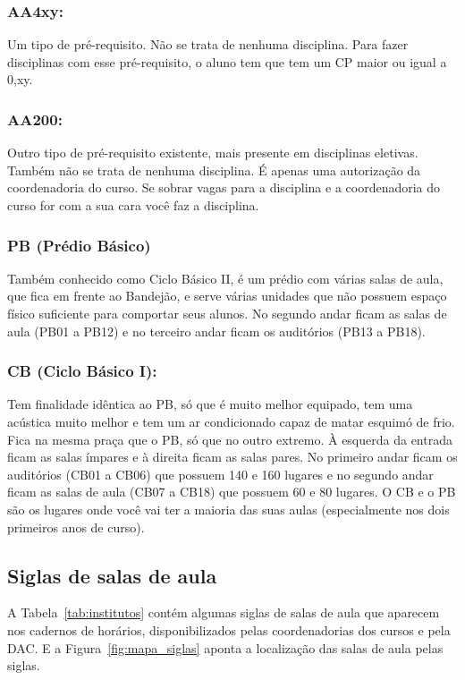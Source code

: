 \subsubsection{AA4xy:} Um tipo de pré-requisito. Não se trata de nenhuma
disciplina. Para fazer disciplinas com esse pré-requisito, o aluno tem que tem
um CP maior ou igual a 0,xy.

\subsubsection{AA200:} Outro tipo de pré-requisito existente, mais presente em
disciplinas eletivas. Também não se trata de nenhuma disciplina. É apenas uma
autorização da coordenadoria do curso. Se sobrar vagas para a disciplina e a
coordenadoria do curso for com a sua cara você faz a disciplina.

\subsubsection{PB (Prédio Básico)} Também conhecido como Ciclo Básico II, é um
prédio com várias salas de aula, que fica em frente ao Bandejão, e serve várias
unidades que não possuem espaço físico suficiente para comportar seus alunos. No
segundo andar ficam as salas de aula (PB01 a PB12) e no terceiro andar ficam os
auditórios (PB13 a PB18).

\subsubsection{CB (Ciclo Básico I):} Tem finalidade idêntica ao PB, só que é
muito melhor equipado, tem uma acústica muito melhor e tem um ar condicionado
capaz de matar esquimó de frio. Fica na mesma praça que o PB, só que no outro
extremo. À esquerda da entrada ficam as salas ímpares e à direita ficam as salas
pares. No primeiro andar ficam os auditórios (CB01 a CB06) que possuem 140 e 160
lugares e no segundo andar ficam as salas de aula (CB07 a CB18) que possuem 60 e
80 lugares.  O CB e o PB são os lugares onde você vai ter a maioria das suas
aulas (especialmente nos dois primeiros anos de curso).

\subsection{Siglas de salas de aula}

A Tabela~\ref{tab:institutos} contém algumas siglas de salas de aula que
aparecem nos cadernos de horários, disponibilizados pelas coordenadorias dos
cursos e pela DAC. E a Figura~\ref{fig:mapa_siglas} aponta a localização das
salas de aula pelas siglas.

